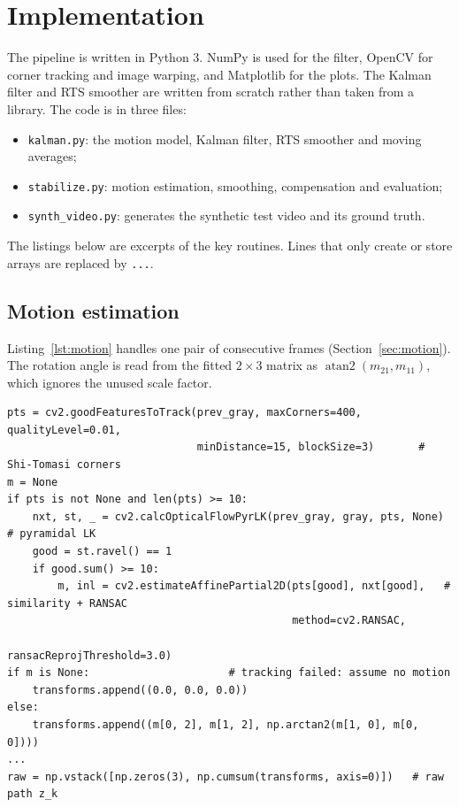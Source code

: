 \documentclass[11pt,a4paper]{article}
\begin{document}
\section{Implementation}\label{sec:impl}
The pipeline is written in Python 3. NumPy is used for the filter, OpenCV for corner tracking
and image warping, and Matplotlib for the plots. The Kalman filter and RTS smoother are written
from scratch rather than taken from a library. The code is in three files:
\begin{itemize}
  \item \texttt{kalman.py}: the motion model, Kalman filter, RTS smoother and moving averages;
  \item \texttt{stabilize.py}: motion estimation, smoothing, compensation and evaluation;
  \item \texttt{synth\_video.py}: generates the synthetic test video and its ground truth.
\end{itemize}
The listings below are excerpts of the key routines. Lines that only create or store arrays
are replaced by \texttt{...}.

\subsection{Motion estimation}
Listing~\ref{lst:motion} handles one pair of consecutive frames
(Section~\ref{sec:motion}). The rotation angle is read from the fitted $2\times3$ matrix as
$\operatorname{atan2}(m_{21}, m_{11})$, which ignores the unused scale factor.

\begin{lstlisting}[caption={Measuring the motion between two frames (\texttt{stabilize.py}).},label=lst:motion]
pts = cv2.goodFeaturesToTrack(prev_gray, maxCorners=400, qualityLevel=0.01,
                              minDistance=15, blockSize=3)       # Shi-Tomasi corners
m = None
if pts is not None and len(pts) >= 10:
    nxt, st, _ = cv2.calcOpticalFlowPyrLK(prev_gray, gray, pts, None)  # pyramidal LK
    good = st.ravel() == 1
    if good.sum() >= 10:
        m, inl = cv2.estimateAffinePartial2D(pts[good], nxt[good],   # similarity + RANSAC
                                             method=cv2.RANSAC,
                                             ransacReprojThreshold=3.0)
if m is None:                      # tracking failed: assume no motion
    transforms.append((0.0, 0.0, 0.0))
else:
    transforms.append((m[0, 2], m[1, 2], np.arctan2(m[1, 0], m[0, 0])))
...
raw = np.vstack([np.zeros(3), np.cumsum(transforms, axis=0)])   # raw path z_k
\end{lstlisting}
\end{document}
